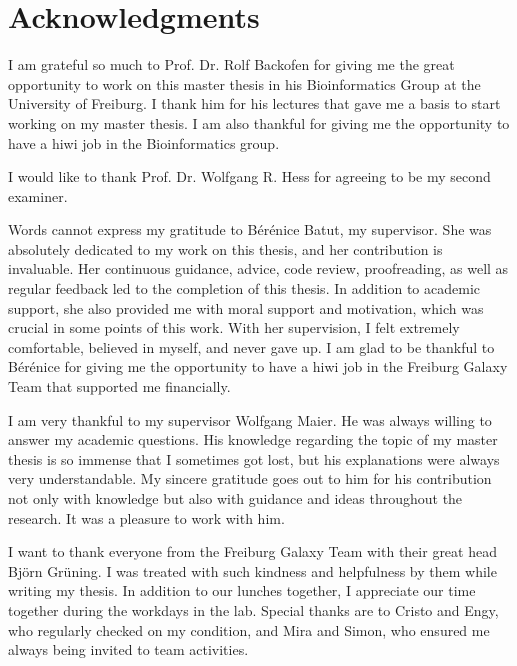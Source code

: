 %
\section*{Acknowledgments}

I am grateful so much to Prof. Dr. Rolf Backofen for giving me the great opportunity to work on this master thesis in his Bioinformatics Group at the University of Freiburg. I thank him for his lectures that gave me a basis to start working on my master thesis. I am also thankful for giving me the opportunity to have a hiwi job in the Bioinformatics group.

I would like to thank Prof. Dr. Wolfgang R. Hess for agreeing to be my second examiner.

Words cannot express my gratitude to Bérénice Batut, my supervisor. She was absolutely dedicated to my work on this thesis, and her contribution is invaluable. Her continuous guidance, advice, code review, proofreading, as well as regular feedback led to the completion of this thesis. In addition to academic support, she also provided me with moral support and motivation, which was crucial in some points of this work. With her supervision, I felt extremely comfortable, believed in myself, and never gave up. I am glad to be thankful to Bérénice for giving me the opportunity to have a hiwi job in the Freiburg Galaxy Team that supported me financially.

I am very thankful to my supervisor Wolfgang Maier. He was always willing to answer my academic questions. His knowledge regarding the topic of my master thesis is so immense that I sometimes got lost, but his explanations were always very understandable. My sincere gratitude goes out to him for his contribution not only with knowledge but also with guidance and ideas throughout the research. It was a pleasure to work with him.

I want to thank everyone from the Freiburg Galaxy Team with their great head Björn Grüning. I was treated with such kindness and helpfulness by them while writing my thesis. In addition to our lunches together, I appreciate our time together during the workdays in the lab. Special thanks are to Cristo and Engy, who regularly checked on my condition, and Mira and Simon, who ensured me always being invited to team activities. 

